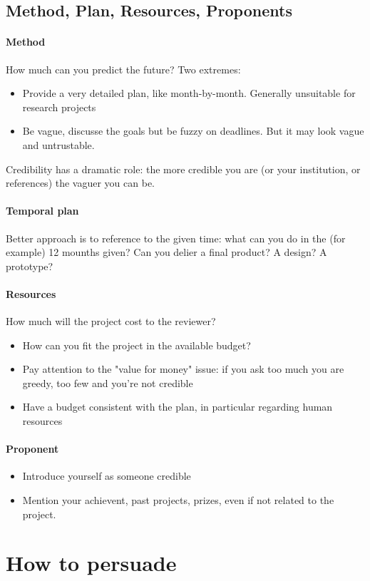 \documentclass{article}
\begin{document}
\subsection{Method, Plan, Resources, Proponents}
\paragraph{Method} How much can you predict the future? Two extremes:
\begin{itemize}
\item Provide a very detailed plan, like month-by-month. Generally unsuitable for research projects
\item Be vague, discusse the goals but be fuzzy on deadlines. But it may look vague and untrustable.
\end{itemize}
Credibility has a dramatic role: the more credible you are (or your institution, or references) the vaguer you can be.
\paragraph{Temporal plan} Better approach is to reference to the given time: what can you do in the (for example) 12 mounths given? Can you delier a final product? A design? A prototype?
\paragraph{Resources} How much will the project cost to the reviewer? 
\begin{itemize}
\item How can you fit the project in the available budget?
\item Pay attention to the "value for money" issue: if you ask too much you are greedy, too few and you're not credible
\item Have a budget consistent with the plan, in particular regarding human resources
\end{itemize}
\paragraph{Proponent}
\begin{itemize}
\item Introduce yourself as someone credible
\item Mention your achievent, past projects, prizes, even if not related to the project. 
\end{itemize}


\section{How to persuade}
\end{document}
